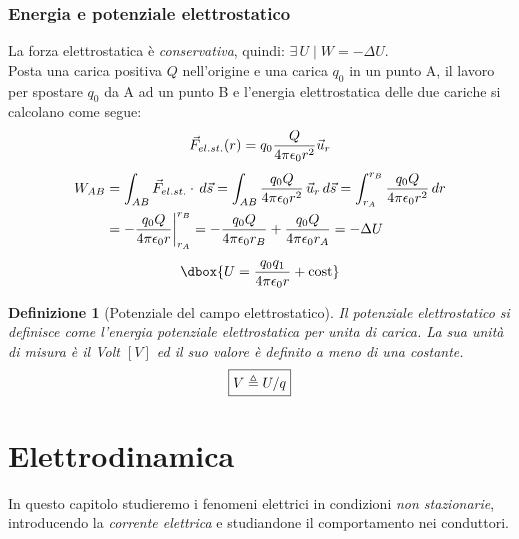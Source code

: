 \documentclass[a4paper,12pt,titlepage,openany]{book}
\theoremstyle{mydef}
\newtheorem{definizione}{Definizione}[chapter]
\newcommand\dboxed[1]{\dbox{\ensuremath{#1}}}  %
\begin{document}
            \subsection{Energia e potenziale elettrostatico}
            La forza elettrostatica è \emph{conservativa}, quindi: $\exists\,U\mid W=-\Delta U$.\\
            Posta una carica positiva $Q$ nell'origine e una carica $q_0$ in un punto A, il lavoro per spostare
            $q_0$ da A ad un punto B e l'energia elettrostatica delle due cariche si calcolano come segue:
            \begin{gather}
            \vec{F}_{el.st.}(r) = q_0\frac{Q}{4\pi\epsilon_0r^2}\vec{u}_r \notag \\[1ex]
            \begin{aligned}
            W_{AB} &= \int_{AB}\vec{F}_{el.st.}\cdot\,d\vec{s}
            = \int_{AB}\frac{q_0Q}{4\pi\epsilon_0r^2}\,\vec{u}_r\,d\vec{s}
            = \int_{r_A}^{r_B}\frac{q_0Q}{4\pi\epsilon_0r^2}\,dr \\
            &= -\frac{q_0Q}{4\pi\epsilon_0r}\biggr\rvert_{r_A}^{r_B}
            = -\frac{q_0Q}{4\pi\epsilon_0r_B} + \frac{q_0Q}{4\pi\epsilon_0r_A} = -\Delta U
            \end{aligned}
            \notag\\[1ex]
            \dboxed{U = \frac{q_0q_1}{4\pi\epsilon_0r} + \text{cost}}
            \end{gather}
            \begin{definizione}[Potenziale del campo elettrostatico]
                Il potenziale elettrostatico si definisce come l'energia potenziale elettrostatica per unita di carica.
                La sua unità di misura è il \emph{Volt} $[V]$ ed il suo valore è definito a meno di una costante.
                \begin{equation}
                    \boxed{V\triangleq U/q}\\
                \end{equation}
            \end{definizione}
    
    \chapter{Elettrodinamica}
        In questo capitolo studieremo i fenomeni elettrici in condizioni \emph{non stazionarie}, introducendo la \emph{corrente elettrica} e studiandone il comportamento nei conduttori.
        
\end{document}
